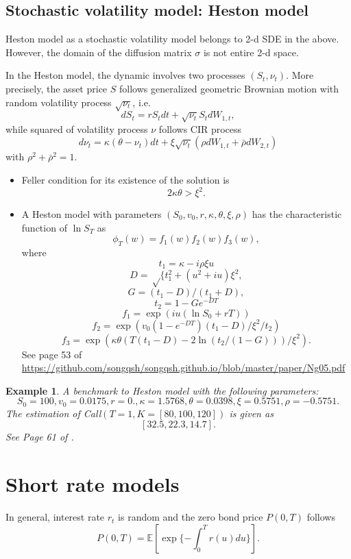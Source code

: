 \documentclass{article}
\newtheorem{example}{Example}
\begin{document}
\subsection{Stochastic volatility model: Heston model}
Heston model as a stochastic volatility model belongs to 2-d SDE in the above. However, the domain of the diffusion matrix $\sigma$ is not entire 2-d space. 

In the Heston model, the dynamic involves two processes $(S_{t}, \nu_{t})$.
More precisely, the asset price $S$ follows generalized geometric Brownian motion with random volatility process $\sqrt{\nu_{t}}$, i.e.  
$$d S_{t} = r S_{t} dt + \sqrt{\nu_{t}} S_{t} dW_{1,t},$$
while squared of volatility process $\nu$ follows CIR process
$$ d \nu_{t} = \kappa (\theta - \nu_{t}) dt + \xi \sqrt{\nu_{t}} (\rho dW_{1,t} + 
\bar \rho d W_{2,t})$$
with $\rho^{2} + \bar \rho^{2} = 1.$ 

\begin{itemize}
\item
Feller condition for its existence of the solution is
$$2\kappa \theta > \xi^{2}.$$
\item A Heston model with parameters
$(S_0, v_0, r, \kappa , \theta, \xi, \rho)$ has the characteristic function of $\ln S_T$ as
$$\phi_T (w) = f_1(w) f_2(w) f_3(w),$$
where
$$t_1 = \kappa - i \rho \xi u$$
$$D = \sqrt\{t_1^2 + (u^2 + iu) \xi^2,$$
$$G = (t_1 - D)/(t_1 +D),$$
$$t_2 = 1 - G e^{-DT}$$
$$f_1 = \exp( iu (\ln S_0 + rT))$$
$$f_2 = \exp(v_0 (1 - e^{-DT}) (t_1 - D)/ \xi^2 /t_2)$$
$$f_3 = \exp(\kappa \theta(T(t_1 -D) - 2 \ln (t_2/(1-G)))/\xi^2).$$
See page 53 of \\
\url{https://github.com/songqsh/songqsh.github.io/blob/master/paper/Ng05.pdf}
\end{itemize}


\begin{example}
\label{exm:heston01}
A benchmark to Heston model with the following parameters:
$$S_0 = 100, v_0 = 0.0175, r= 0., \kappa = 1.5768, \theta =  0.0398, \xi =  0.5751, \rho = -0.5751.$$
The estimation of Call$(T =1, K = [80, 100, 120])$ is given as 
$$
[32.5, 22.3, 14.7].
$$
See Page 61 of \cite{Hir12}. 
\end{example}



\section{Short rate models}

In general, interest rate $r_{t}$ is random and 
the zero bond price $P(0, T)$ follows
$$P(0, T) = \mathbb E[ \exp\{- \int_0^T r(u) du\} ].$$
\end{document}
